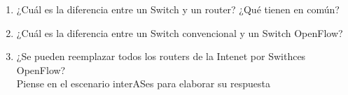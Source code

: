 \begin{enumerate}
	\item ¿Cuál es la diferencia entre un Switch y un router? ¿Qué tienen en común?
	\item ¿Cuál es la diferencia entre un Switch convencional y un Switch OpenFlow?
	\item ¿Se pueden reemplazar todos los routers de la Intenet por Swithces OpenFlow?\\
	Piense en el escenario interASes para elaborar su respuesta
\end{enumerate}

